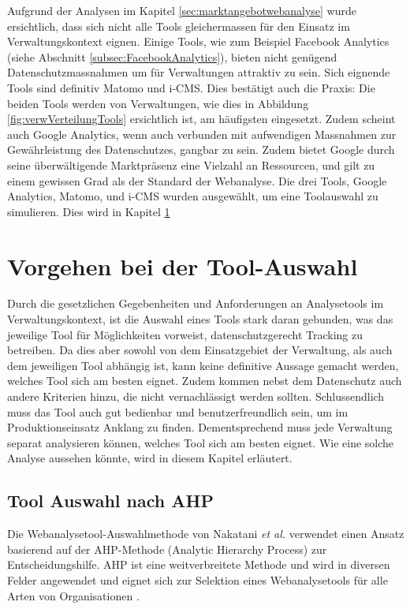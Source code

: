 Aufgrund der Analysen im Kapitel \ref{sec:marktangebotwebanalyse} wurde ersichtlich, dass sich nicht alle Tools gleichermassen für den Einsatz im Verwaltungskontext eignen. Einige Tools, wie zum Beispiel Facebook Analytics (siehe Abschnitt \ref{subsec:FacebookAnalytics}), bieten nicht genügend Datenschutzmassnahmen um für Verwaltungen attraktiv zu sein. Sich eignende Tools sind definitiv Matomo und i-CMS. Dies bestätigt auch die Praxis: Die beiden Tools werden von Verwaltungen, wie dies in Abbildung \ref{fig:verwVerteilungTools} ersichtlich ist, am häufigsten eingesetzt. Zudem scheint auch Google Analytics, wenn auch verbunden mit aufwendigen Massnahmen zur Gewährleistung des Datenschutzes, gangbar zu sein. Zudem bietet Google durch seine überwältigende Marktpräsenz eine Vielzahl an Ressourcen, und gilt zu einem gewissen Grad als der Standard der Webanalyse. Die drei Tools, Google Analytics, Matomo, und i-CMS wurden ausgewählt, um eine Toolauswahl zu simulieren. Dies wird in Kapitel \ref{sec:toolsel}

\section{Vorgehen bei der Tool-Auswahl} \label{sec:toolsel}

Durch die gesetzlichen Gegebenheiten und Anforderungen an Analysetools im Verwaltungskontext, ist die Auswahl eines Tools stark daran gebunden, was das jeweilige Tool für Möglichkeiten vorweist, datenschutzgerecht Tracking zu betreiben. Da dies aber sowohl von dem Einsatzgebiet der Verwaltung, als auch dem jeweiligen Tool abhängig ist, kann keine definitive Aussage gemacht werden, welches Tool sich am besten eignet. Zudem kommen nebst dem Datenschutz auch andere Kriterien hinzu, die nicht vernachlässigt werden sollten. Schlussendlich muss das Tool auch gut bedienbar und benutzerfreundlich sein, um im Produktionseinsatz Anklang zu finden. Dementsprechend muss jede Verwaltung separat analysieren können, welches Tool sich am besten eignet. Wie eine solche Analyse aussehen könnte, wird in diesem Kapitel erläutert. 

\subsection{Tool Auswahl nach AHP} \label{subsec:toolauswAHP}

Die Webanalysetool-Auswahlmethode von Nakatani \textit{et al.} \parencite{nakatani2011toolselectionmethod} verwendet einen Ansatz basierend auf der AHP-Methode (Analytic Hierarchy Process) zur Entscheidungshilfe. AHP ist eine weitverbreitete Methode und wird in diversen Felder angewendet und eignet sich zur Selektion eines Webanalysetools für alle Arten von Organisationen \parencite[S. 176]{nakatani2011toolselectionmethod}. 

